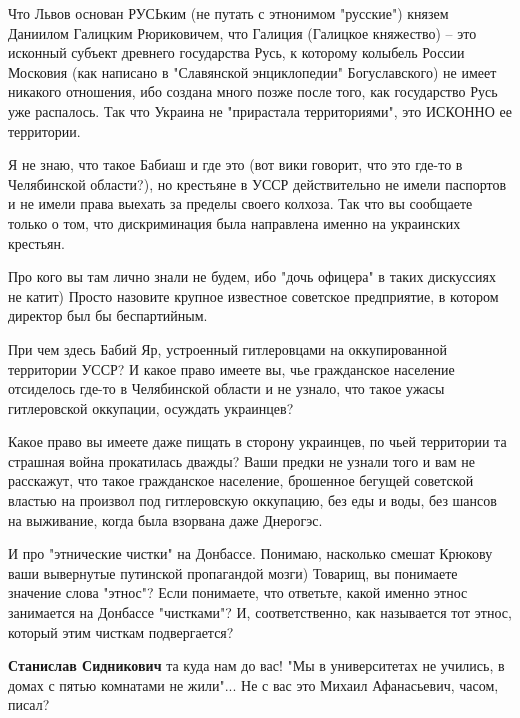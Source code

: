 \begin{itemize}
\begin{itemize}
Что Львов основан РУСЬким (не путать с этнонимом "русские") князем Даниилом
Галицким Рюриковичем, что Галиция (Галицкое княжество) – это исконный субъект
древнего государства Русь, к которому колыбель России Московия (как написано в
"Славянской энциклопедии" Богуславского) не имеет никакого отношения, ибо
создана много позже после того, как государство Русь уже распалось. Так что
Украина не "прирастала территориями", это ИСКОННО ее территории.

Я не знаю, что такое Бабиаш и где это (вот вики говорит, что это где-то в
Челябинской области?), но крестьяне в УССР действительно не имели паспортов и
не имели права выехать за пределы своего колхоза. Так что вы сообщаете только о
том, что дискриминация была направлена именно на украинских крестьян.

Про кого вы там лично знали не будем, ибо "дочь офицера" в таких дискуссиях не
катит) Просто назовите крупное известное советское предприятие, в котором
директор был бы беспартийным.

При чем здесь Бабий Яр, устроенный гитлеровцами на оккупированной территории
УССР? И какое право имеете вы, чье гражданское население отсиделось где-то в
Челябинской области и не узнало, что такое ужасы гитлеровской оккупации,
осуждать украинцев? 

Какое право вы имеете даже пищать в сторону украинцев, по чьей территории та
страшная война прокатилась дважды? Ваши предки не узнали того и вам не
расскажут, что такое гражданское население, брошенное бегущей советской властью
на произвол под гитлеровскую оккупацию, без еды и воды, без шансов на
выживание, когда была взорвана даже Днерогэс.

И про "этнические чистки" на Донбассе. Понимаю, насколько смешат Крюкову ваши
вывернутые путинской пропагандой мозги) Товарищ, вы понимаете значение слова
"этнос"? Если понимаете, что ответьте, какой именно этнос занимается на
Донбассе "чистками"? И, соответственно, как называется тот этнос, который этим
чисткам подвергается?

 
\textbf{Станислав Сидникович} та куда нам до вас! "Мы в университетах не учились, в домах с пятью комнатами не жили"... Не с вас это Михаил Афанасьевич, часом, писал?

 

\end{itemize}
\end{itemize}
